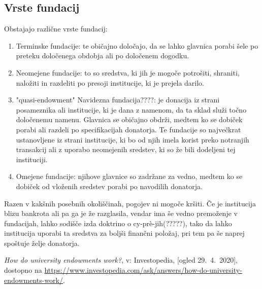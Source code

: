 \documentclass[12pt, a4paper]{article}
\begin{document}
\subsection{Vrste fundacij}
Obstajajo različne vrste fundacij:
\begin{enumerate}
\item Terminske fundacije: te običajno določajo, da se lahko glavnica porabi šele po preteku določenega obdobja ali po določenem dogodku.
\item Neomejene fundacije: to so sredstva, ki jih je mogoče potrošiti, shraniti, naložiti in razdeliti po presoji institucije, ki je prejela darilo.
\item "quasi-endowment" Navidezna fundacija????: je donacija iz strani posameznika ali institucije, ki je dana z namenom, da ta sklad služi točno določenemu namenu. Glavnica se običajno obdrži, medtem ko se dobiček porabi ali razdeli po specifikacijah donatorja. Te fundacije so največkrat ustanovljene iz strani institucije, ki bo od njih imela korist preko notranjih transakcij ali z uporabo neomejenih sredstev, ki so že bili dodeljeni tej instituciji.
\item Omejene fundacije: njihove glavnice so zadržane za vedno, medtem ko se dobiček od vloženih sredstev porabi po navodilih donatorja.
\end{enumerate}

Razen v kakšnih posebnih okoliščinah, pogojev ni mogoče kršiti. Če je institucija blizu bankrota ali pa ga je že razglasila, vendar ima še vedno premoženje v fundacijah, lahko sodišče izda doktrino o cy-prè-jih(?????), tako da lahko institucija uporabi ta sredstva za boljši finančni položaj, pri tem pa še naprej spoštuje želje donatorja.





\newpage
\begin{thebibliography}{99}

\emph{How do university endowments work?}, v: Investopedia, [ogled 29.~4.~2020], dostopno na \url{https://www.investopedia.com/ask/answers/how-do-university-endowments-work/}.

\end{thebibliography}
\end{document}
